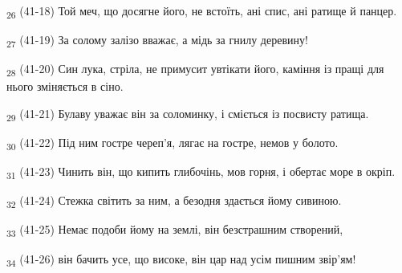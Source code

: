 \begin{tcolorbox}
\textsubscript{26} (41-18) Той меч, що досягне його, не встоїть, ані спис, ані ратище й панцер.
\end{tcolorbox}
\begin{tcolorbox}
\textsubscript{27} (41-19) За солому залізо вважає, а мідь за гнилу деревину!
\end{tcolorbox}
\begin{tcolorbox}
\textsubscript{28} (41-20) Син лука, стріла, не примусит увтікати його, каміння із пращі для нього зміняється в сіно.
\end{tcolorbox}
\begin{tcolorbox}
\textsubscript{29} (41-21) Булаву уважає він за соломинку, і сміється із посвисту ратища.
\end{tcolorbox}
\begin{tcolorbox}
\textsubscript{30} (41-22) Під ним гостре череп'я, лягає на гостре, немов у болото.
\end{tcolorbox}
\begin{tcolorbox}
\textsubscript{31} (41-23) Чинить він, що кипить глибочінь, мов горня, і обертає море в окріп.
\end{tcolorbox}
\begin{tcolorbox}
\textsubscript{32} (41-24) Стежка світить за ним, а безодня здається йому сивиною.
\end{tcolorbox}
\begin{tcolorbox}
\textsubscript{33} (41-25) Немає подоби йому на землі, він безстрашним створений,
\end{tcolorbox}
\begin{tcolorbox}
\textsubscript{34} (41-26) він бачить усе, що високе, він цар над усім пишним звір'ям!
\end{tcolorbox}
